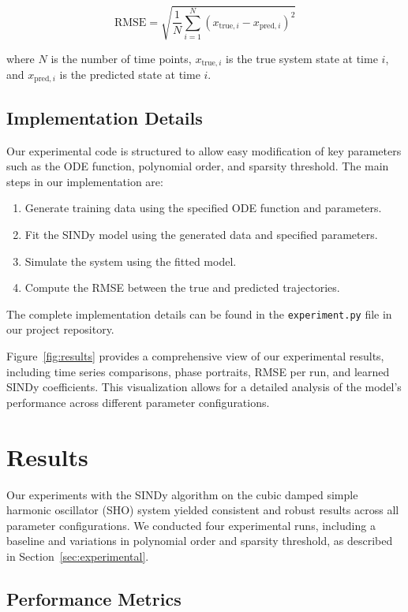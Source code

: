 \documentclass{article} %
\begin{document}
\begin{equation}
    \text{RMSE} = \sqrt{\frac{1}{N}\sum_{i=1}^N (x_{\text{true},i} - x_{\text{pred},i})^2}
\end{equation}

where $N$ is the number of time points, $x_{\text{true},i}$ is the true system state at time $i$, and $x_{\text{pred},i}$ is the predicted state at time $i$.

\subsection{Implementation Details}
Our experimental code is structured to allow easy modification of key parameters such as the ODE function, polynomial order, and sparsity threshold. The main steps in our implementation are:

\begin{enumerate}
    \item Generate training data using the specified ODE function and parameters.
    \item Fit the SINDy model using the generated data and specified parameters.
    \item Simulate the system using the fitted model.
    \item Compute the RMSE between the true and predicted trajectories.
\end{enumerate}

The complete implementation details can be found in the \texttt{experiment.py} file in our project repository.

Figure~\ref{fig:results} provides a comprehensive view of our experimental results, including time series comparisons, phase portraits, RMSE per run, and learned SINDy coefficients. This visualization allows for a detailed analysis of the model's performance across different parameter configurations.

\section{Results}
\label{sec:results}

Our experiments with the SINDy algorithm on the cubic damped simple harmonic oscillator (SHO) system yielded consistent and robust results across all parameter configurations. We conducted four experimental runs, including a baseline and variations in polynomial order and sparsity threshold, as described in Section~\ref{sec:experimental}.

\subsection{Performance Metrics}
\end{document}
